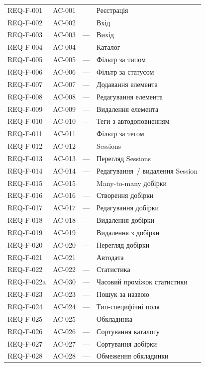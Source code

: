 \begin{longtable}{L{2.8cm} L{3.2cm} L{2.5cm} L{5.5cm}}
REQ-F-001 & AC-001 &  & Реєстрація \\
REQ-F-002 & AC-002 &  & Вхід \\
REQ-F-003 & AC-003 & --- & Вихід \\
REQ-F-004 & AC-004 & --- & Каталог \\
REQ-F-005 & AC-005 & --- & Фільтр за типом \\
REQ-F-006 & AC-006 & --- & Фільтр за статусом \\
REQ-F-007 & AC-007 & --- & Додавання елемента \\
REQ-F-008 & AC-008 & --- & Редагування елемента \\
REQ-F-009 & AC-009 & --- & Видалення елемента \\
REQ-F-010 & AC-010 & --- & Теги з автодоповненням \\
REQ-F-011 & AC-011 &  & Фільтр за тегом \\
REQ-F-012 & AC-012 &  & Sessions \\
REQ-F-013 & AC-013 & --- & Перегляд Sessions \\
REQ-F-014 & AC-014 & --- & Редагування~/ видалення Session \\
REQ-F-015 & AC-015 &  & Many-to-many добірки \\
REQ-F-016 & AC-016 & --- & Створення добірки \\
REQ-F-017 & AC-017 & --- & Редагування добірки \\
REQ-F-018 & AC-018 & --- & Видалення добірки \\
REQ-F-019 & AC-019 &  & Видалення з добірки \\
REQ-F-020 & AC-020 & --- & Перегляд добірки \\
REQ-F-021 & AC-021 &  & Автодата \\
REQ-F-022 & AC-022 & --- & Статистика \\
REQ-F-022a & AC-030 & --- & Часовий проміжок статистики \\
REQ-F-023 & AC-023 & --- & Пошук за назвою \\
REQ-F-024 & AC-024 & --- & Тип-специфічні поля \\
REQ-F-025 & AC-025 & --- & Обкладинка \\
REQ-F-026 & AC-026 & --- & Сортування каталогу \\
REQ-F-027 & AC-027 & --- & Сортування добірки \\
REQ-F-028 & AC-028 & --- & Обмеження обкладинки \\

\end{longtable}
